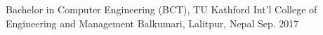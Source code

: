 
\begin{cventries}
  \cventry
    {Bachelor in Computer Engineering (BCT), TU} %
    {Kathford Int’l College of Engineering and Management} %
    {Balkumari, Lalitpur, Nepal} %
    {Sep. 2017} %
    { } %
\end{cventries}
